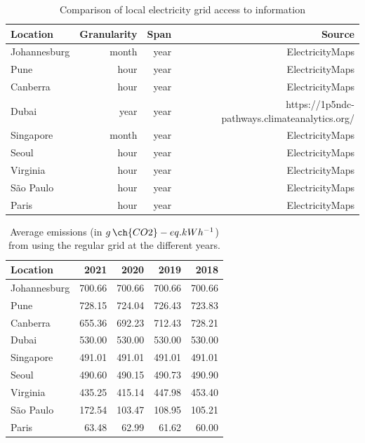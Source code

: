 \begin{table}[H]
  
\caption{Comparison of local electricity grid access to information }\label{tab:grid_emissions_hist} \centering
  
  \begin{tabular}{|l|r|r|r|}
  \hline
    
  \textbf{Location} &   \textbf{Granularity} & \textbf{Span} & \textbf{Source} \\
  \hline
  Johannesburg & month & year & ElectricityMaps  \\
  \hline
  Pune  & hour & year & ElectricityMaps  \\
  \hline
  Canberra  & hour &  year & ElectricityMaps \\
  \hline
  Dubai    & year & year & https://1p5ndc-pathways.climateanalytics.org/  \\
  \hline
  Singapore & month & year & ElectricityMaps \\
  \hline     
  Seoul     & hour & year & ElectricityMaps \\
  \hline
  Virginia  &  hour & year & ElectricityMaps \\
  \hline
  São Paulo & hour & year  & ElectricityMaps \\
  \hline 
  Paris     & hour & year  & ElectricityMaps  \\
  \hline


\end{tabular}  
\end{table}



\begin{table}
  
  \caption{Average emissions (in $g\,\ch{CO2}-eq.kWh^{-1}$) from using the regular grid at the different years.}\label{tab:grid_emissions_avg_year} \centering
  \begin{tabular}{|l|r|r|r|r|}    
  \hline   
  \textbf{Location} &  \textbf{2021} & \textbf{2020} & \textbf{2019} & \textbf{2018}\\
  \hline
  Johannesburg & 700.66 & 700.66 & 700.66 & 700.66  \\
  \hline
  Pune & 728.15 & 724.04 & 726.43 & 723.83     \\
  \hline
  Canberra & 655.36 & 692.23 & 712.43 & 728.21\\
  \hline
  Dubai & 530.00  & 530.00 & 530.00 & 530.00     \\
  \hline
  Singapore & 491.01 & 491.01 & 491.01 & 491.01 \\
  \hline     
  Seoul & 490.60 & 490.15 & 490.73 & 490.90     \\
  \hline
  Virginia  & 435.25 & 415.14 & 447.98 & 453.40 \\
  \hline
  São Paulo &  172.54 &  103.47 & 108.95 &  105.21 \\
  \hline 
  Paris &  63.48  & 62.99 & 61.62   & 60.00   \\
  \hline

\end{tabular}  
\end{table}

